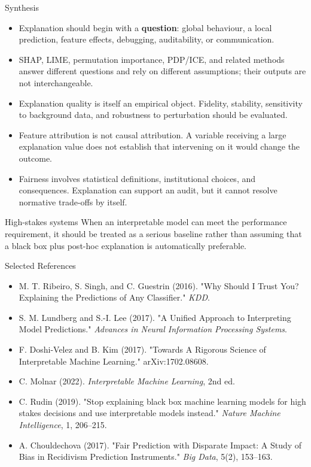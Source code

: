 \documentclass[aspectratio=169]{beamer}
\begin{document}
\begin{frame}{Synthesis}
  \begin{itemize}
    \item Explanation should begin with a \textbf{question}: global behaviour, a local prediction, feature effects, debugging, auditability, or communication.
    \item SHAP, LIME, permutation importance, PDP/ICE, and related methods answer different questions and rely on different assumptions; their outputs are not interchangeable.
    \item Explanation quality is itself an empirical object. Fidelity, stability, sensitivity to background data, and robustness to perturbation should be evaluated.
    \item Feature attribution is not causal attribution. A variable receiving a large explanation value does not establish that intervening on it would change the outcome.
    \item Fairness involves statistical definitions, institutional choices, and consequences. Explanation can support an audit, but it cannot resolve normative trade-offs by itself.
  \end{itemize}

  \vspace{0.5em}

  \begin{alertbox}{High-stakes systems}
    When an interpretable model can meet the performance requirement, it should be treated as a serious baseline rather than assuming that a black box plus post-hoc explanation is automatically preferable.
  \end{alertbox}
\end{frame}

\begin{frame}{Selected References}
  \small
  \begin{itemize}
    \item M. T. Ribeiro, S. Singh, and C. Guestrin (2016). "Why Should I Trust You? Explaining the Predictions of Any Classifier." \textit{KDD}.
    \item S. M. Lundberg and S.-I. Lee (2017). "A Unified Approach to Interpreting Model Predictions." \textit{Advances in Neural Information Processing Systems}.
    \item F. Doshi-Velez and B. Kim (2017). "Towards A Rigorous Science of Interpretable Machine Learning." arXiv:1702.08608.
    \item C. Molnar (2022). \textit{Interpretable Machine Learning}, 2nd ed.
    \item C. Rudin (2019). "Stop explaining black box machine learning models for high stakes decisions and use interpretable models instead." \textit{Nature Machine Intelligence}, 1, 206--215.
    \item A. Chouldechova (2017). "Fair Prediction with Disparate Impact: A Study of Bias in Recidivism Prediction Instruments." \textit{Big Data}, 5(2), 153--163.
  \end{itemize}
\end{frame}

\contactslide
\end{document}
